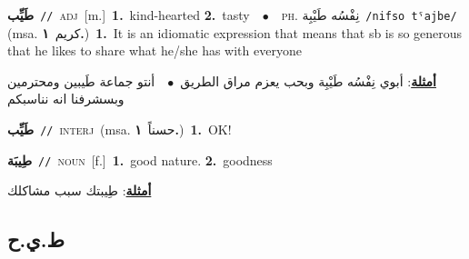 \documentclass[10pt,a4paper,twoside]{article} %
\begin{document}
\begin{multicols}{2}
{\setlength\topsep{0pt}\textbf{\foreignlanguage{arabic}{طَيِّب}}\ {\color{gray}\texttt{//}\color{black}}\ \textsc{adj}\ [m.]\ \textbf{1.}~kind-hearted  \textbf{2.}~tasty\ \ $\bullet$\ \ \textsc{ph.} \color{gray} \foreignlanguage{arabic}{نِفْسُه طَيْبِة}\color{black}\ {\color{gray}\texttt{/{\sffamily nifso tˤajbe}/}\color{black}}\ \color{gray} (msa. \foreignlanguage{arabic}{كريم}~\foreignlanguage{arabic}{\textbf{١.}})\color{black}\ \textbf{1.}~It is an idiomatic expression that means that sb is so generous that he likes to share what he/she has with everyone\  \begin{flushright}\color{gray}\foreignlanguage{arabic}{\textbf{\underline{\foreignlanguage{arabic}{أمثلة}}}: أبوي نِفْسُه طَيْبِة وبحب يعزم مراق الطريق\ $\bullet$\ \  أنتو جماعة طَيبين ومحترمين وبسشرفنا انه نناسبكم}\end{flushright}\color{black}} \vspace{2mm}

{\setlength\topsep{0pt}\textbf{\foreignlanguage{arabic}{طَيِّب}}\ {\color{gray}\texttt{//}\color{black}}\ \textsc{interj}\ \color{gray}(msa. \foreignlanguage{arabic}{حسناً}~\foreignlanguage{arabic}{\textbf{١.}})\color{black}\ \textbf{1.}~OK!\ } \vspace{2mm}

{\setlength\topsep{0pt}\textbf{\foreignlanguage{arabic}{طِيبَة}}\ {\color{gray}\texttt{//}\color{black}}\ \textsc{noun}\ [f.]\ \textbf{1.}~good nature.  \textbf{2.}~goodness\  \begin{flushright}\color{gray}\foreignlanguage{arabic}{\textbf{\underline{\foreignlanguage{arabic}{أمثلة}}}: طِيبتك سبب مشاكلك}\end{flushright}\color{black}} \vspace{2mm}

\vspace{-3mm}
\subsection*{\color{blue}\foreignlanguage{arabic}{ط.ي.ح}\color{blue}{}} 


\end{multicols}
\end{document}
